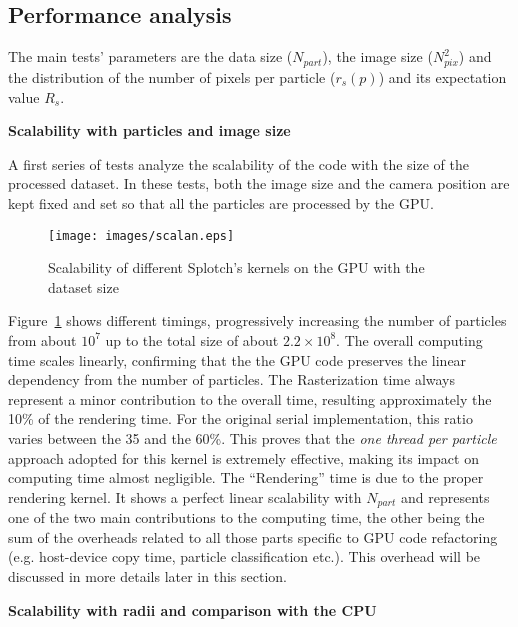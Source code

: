 \documentclass[11pt]{article}
\begin{document}
\subsection{Performance analysis}
\label{sec:performance}

The main tests' parameters are the data size ($N_{part}$),
the image size ($N_{pix}^2$) and the distribution of the number of pixels 
per particle ($r_s(p)$) and its expectation value $R_s$.

\medskip
\noindent 
{\bf Scalability with particles and image size}

A first series of tests analyze the scalability of the code
with the size of the processed dataset. In these tests, both the image size
and the camera position are kept fixed and set so that all the particles are processed 
by the GPU.

\begin{figure}
\centering
\texttt{[image: images/scalan.eps]}
\caption{Scalability of different Splotch's kernels on the GPU with the dataset size}
\label{fig:scalability}
\end{figure}

Figure~\ref{fig:scalability} shows different timings, progressively increasing the number of particles
from about $10^7$ up to the total size of about $2.2\times 10^8$. 
The overall computing time scales linearly, 
confirming that the the GPU code preserves the linear dependency from the 
number of particles. 
The Rasterization time always represent 
a minor contribution to the overall time, resulting approximately the 10\% of the rendering 
time. For the original serial implementation, this ratio varies between the 35 and the 60\%.
This proves that the {\it one thread per particle} approach adopted for this kernel
is extremely effective, making its impact on computing time almost negligible.
The ``Rendering'' time 
is due to the proper rendering kernel. It shows a perfect linear scalability
with $N_{part}$ and represents one of the two main contributions
to the computing time, the other being the sum of the overheads related to all those 
parts specific to GPU code refactoring 
(e.g. host-device copy time, particle classification etc.). 
This overhead  will be discussed in more details later in this section.

\medskip
\noindent
{\bf Scalability with radii and comparison with the CPU}
\end{document}
